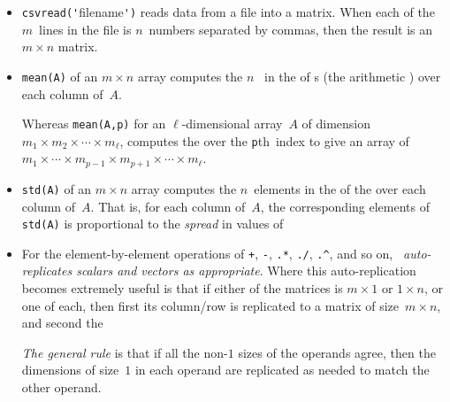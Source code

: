 \begin{table}
\begin{minipage}{\linewidth}
\begin{itemize}
\item  {}\verb|csvread('|filename\verb|')| reads data from a file into a matrix.
When each of the \(m\)~lines in the file is \(n\)~numbers separated by commas, then the result is an \(m\times n\) matrix. 

\item {}\verb|mean(A)| of an \(m\times n\) array computes the \(n\)~ in the  of s (the arithmetic ) over each column of~\(A\).

Whereas \verb|mean(A,p)| for an \(\ell\)-dimensional array~\(A\) of dimension \(m_1\times m_2\times\cdots\times m_\ell\),  computes the  over the \verb|p|th~index to give an array of  \(m_1\times\cdots\times m_{p-1}\times m_{p+1}\times\cdots\times m_\ell\).

\item {}\verb|std(A)| of an \(m\times n\) array computes the \(n\)~elements in the  of the  over each column of~\(A\).  
That is, for each column of~\(A\), the corresponding elements of \verb|std(A)| is proportional to the \emph{spread} in values of 

\item For the element-by-element operations of \verb|+|, \verb|-|, \verb|.*|, \verb|./|, \verb|.^|, and so on, \emph{\script\ auto-replicates scalars and vectors as appropriate}. 
Where this auto-replication becomes extremely useful is that if either of the matrices is \(m\times1\) or \(1\times n\), or one of each, then first its column\slash row is replicated to a matrix of size~\(m\times n\), and second the 

\emph{The general rule} is that if all the non-\(1\) sizes of the operands agree, then the dimensions of size~\(1\) in each operand are replicated as needed to match the other operand.



\end{itemize}
\end{minipage}
\end{table}
